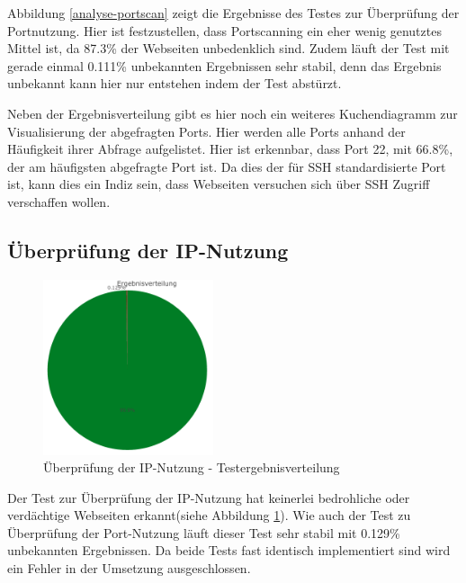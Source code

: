 Abbildung \ref{analyse-portscan} zeigt die Ergebnisse des Testes zur Überprüfung der Portnutzung. Hier ist festzustellen, dass Portscanning ein eher wenig genutztes Mittel ist, da 87.3\% der Webseiten unbedenklich sind. Zudem läuft der Test mit gerade einmal 0.111\% unbekannten Ergebnissen sehr stabil, denn das Ergebnis unbekannt kann hier nur entstehen indem der Test abstürzt.

Neben der Ergebnisverteilung gibt es hier noch ein weiteres Kuchendiagramm zur Visualisierung der abgefragten Ports. Hier werden alle Ports anhand der Häufigkeit ihrer Abfrage aufgelistet. Hier ist erkennbar, dass Port 22, mit 66.8\%, der am häufigsten abgefragte Port ist. Da dies der für SSH standardisierte Port ist, kann dies ein Indiz sein, dass Webseiten versuchen sich über SSH Zugriff verschaffen wollen.

\subsection{Überprüfung der IP-Nutzung}

\begin{figure}[H]
  \centering
  \includegraphics[width=5cm]{images/stats/diaipscan}
  \caption{Überprüfung der IP-Nutzung - Testergebnisverteilung}
  \label{fig:analyse-diaipscan}
\end{figure}

Der Test zur Überprüfung der IP-Nutzung hat keinerlei bedrohliche oder verdächtige Webseiten erkannt(siehe Abbildung \ref{fig:analyse-diaipscan}). Wie auch der Test zu Überprüfung der Port-Nutzung läuft dieser Test sehr stabil mit 0.129\% unbekannten Ergebnissen. Da beide Tests fast identisch implementiert sind wird ein Fehler in der Umsetzung ausgeschlossen.


